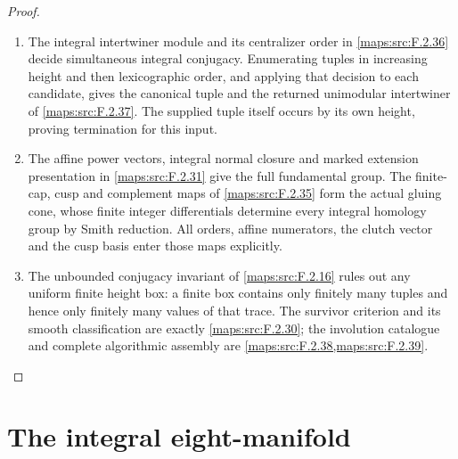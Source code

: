 \documentclass[11pt,a4paper]{article}
\theoremstyle{definition}
\begin{document}
\begin{proof}
\begin{enumerate}[label=\arabic*.]
\item The integral intertwiner module and its centralizer order in
\cref{maps:src:F.2.36} decide simultaneous integral conjugacy. Enumerating
tuples in increasing height and then lexicographic order, and applying
that decision to each candidate, gives the canonical tuple and the
returned unimodular intertwiner of \cref{maps:src:F.2.37}. The supplied
tuple itself occurs by its own height, proving termination for this input.
\item The affine power vectors, integral normal closure and marked
extension presentation in \cref{maps:src:F.2.31} give the full fundamental
group. The finite-cap, cusp and complement maps of
\cref{maps:src:F.2.35} form the actual gluing cone, whose finite integer
differentials determine every integral homology group by Smith reduction.
All orders, affine numerators, the clutch vector and the cusp basis enter
those maps explicitly.
\item The unbounded conjugacy invariant of \cref{maps:src:F.2.16}
rules out any uniform finite height box: a finite box contains only
finitely many tuples and hence only finitely many values of that trace.
The survivor criterion and its smooth classification are exactly
\cref{maps:src:F.2.30}; the involution catalogue and complete algorithmic
assembly are \cref{maps:src:F.2.38,maps:src:F.2.39}.
\end{enumerate}
\end{proof}



\section{The integral eight-manifold}
\end{document}
